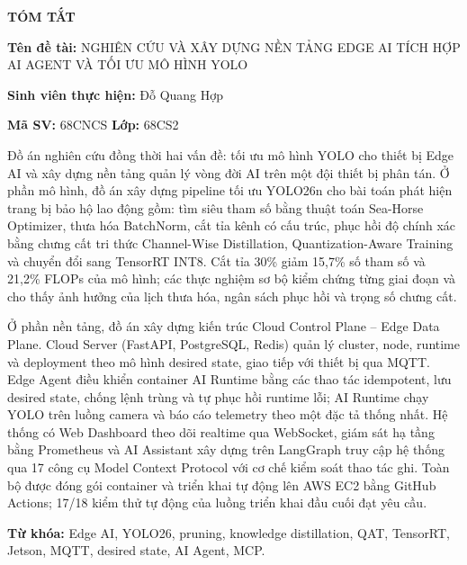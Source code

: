 \thispagestyle{empty}
\begin{center}{\Large\bfseries TÓM TẮT}\end{center}

\noindent\textbf{Tên đề tài:} NGHIÊN CỨU VÀ XÂY DỰNG NỀN TẢNG EDGE AI TÍCH HỢP
AI AGENT VÀ TỐI ƯU MÔ HÌNH YOLO

\noindent\textbf{Sinh viên thực hiện:} Đỗ Quang Hợp

\noindent\textbf{Mã SV:} 68CNCS \hspace{3cm} \textbf{Lớp:} 68CS2

Đồ án nghiên cứu đồng thời hai vấn đề: tối ưu mô hình YOLO cho thiết bị Edge AI
và xây dựng nền tảng quản lý vòng đời AI trên một đội thiết bị phân tán. Ở phần
mô hình, đồ án xây dựng pipeline tối ưu YOLO26n cho bài toán phát hiện trang bị
bảo hộ lao động gồm: tìm siêu tham số bằng thuật toán Sea-Horse Optimizer, thưa
hóa BatchNorm, cắt tỉa kênh có cấu trúc, phục hồi độ chính xác bằng chưng cất tri
thức Channel-Wise Distillation, Quantization-Aware Training và chuyển đổi sang
TensorRT INT8. Cắt tỉa 30\% giảm 15,7\% số tham số và 21,2\% FLOPs của mô hình;
các thực nghiệm sơ bộ kiểm chứng từng giai đoạn và cho thấy ảnh hưởng của lịch
thưa hóa, ngân sách phục hồi và trọng số chưng cất.

Ở phần nền tảng, đồ án xây dựng kiến trúc Cloud Control Plane -- Edge Data Plane.
Cloud Server (FastAPI, PostgreSQL, Redis) quản lý cluster, node, runtime và
deployment theo mô hình desired state, giao tiếp với thiết bị qua MQTT. Edge Agent
điều khiển container AI Runtime bằng các thao tác idempotent, lưu desired state,
chống lệnh trùng và tự phục hồi runtime lỗi; AI Runtime chạy YOLO trên luồng camera
và báo cáo telemetry theo một đặc tả thống nhất. Hệ thống có Web Dashboard theo
dõi realtime qua WebSocket, giám sát hạ tầng bằng Prometheus và AI Assistant xây
dựng trên LangGraph truy cập hệ thống qua 17 công cụ Model Context Protocol với cơ
chế kiểm soát thao tác ghi. Toàn bộ được đóng gói container và triển khai tự động
lên AWS EC2 bằng GitHub Actions; 17/18 kiểm thử tự động của luồng triển khai đầu
cuối đạt yêu cầu.

\noindent\textbf{Từ khóa:} Edge AI, YOLO26, pruning, knowledge distillation, QAT,
TensorRT, Jetson, MQTT, desired state, AI Agent, MCP.
\newpage
